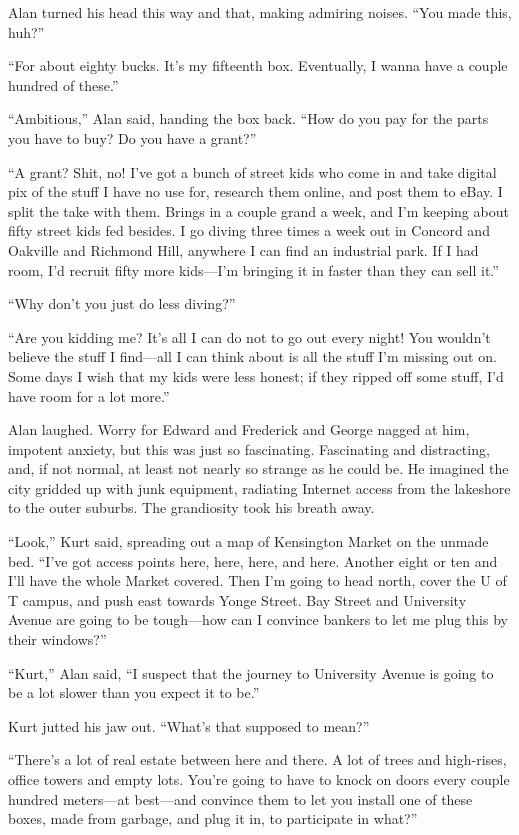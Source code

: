 Alan turned his head this way and that, making admiring noises.  ``You
made this, huh?''

``For about eighty bucks.  It's my fifteenth box.  Eventually, I wanna
have a couple hundred of these.''

``Ambitious,'' Alan said, handing the box back.  ``How do you pay for
the parts you have to buy?  Do you have a grant?''

``A grant?  Shit, no!  I've got a bunch of street kids who come in and
take digital pix of the stuff I have no use for, research them online,
and post them to eBay.  I split the take with them.  Brings in a
couple grand a week, and I'm keeping about fifty street kids fed
besides.  I go diving three times a week out in Concord and Oakville
and Richmond Hill, anywhere I can find an industrial park.  If I had
room, I'd recruit fifty more kids---I'm bringing it in faster than
they can sell it.''

``Why don't you just do less diving?''

``Are you kidding me?  It's all I can do not to go out every night! 
You wouldn't believe the stuff I find---all I can think about is all
the stuff I'm missing out on.  Some days I wish that my kids were less
honest; if they ripped off some stuff, I'd have room for a lot more.''

Alan laughed.  Worry for Edward and Frederick and George nagged at
him, impotent anxiety, but this was just so fascinating.  Fascinating
and distracting, and, if not normal, at least not nearly so strange as
he could be.  He imagined the city gridded up with junk equipment,
radiating Internet access from the lakeshore to the outer suburbs. 
The grandiosity took his breath away.

``Look,'' Kurt said, spreading out a map of Kensington Market on the
unmade bed.  ``I've got access points here, here, here, and here. 
Another eight or ten and I'll have the whole Market covered.  Then I'm
going to head north, cover the U of T campus, and push east towards
Yonge Street.  Bay Street and University Avenue are going to be
tough---how can I convince bankers to let me plug this by their
windows?''

``Kurt,'' Alan said, ``I suspect that the journey to University Avenue
is going to be a lot slower than you expect it to be.''

Kurt jutted his jaw out.  ``What's that supposed to mean?''

``There's a lot of real estate between here and there.  A lot of trees
and high-rises, office towers and empty lots.  You're going to have to
knock on doors every couple hundred meters---at best---and convince
them to let you install one of these boxes, made from garbage, and
plug it in, to participate in what?''

